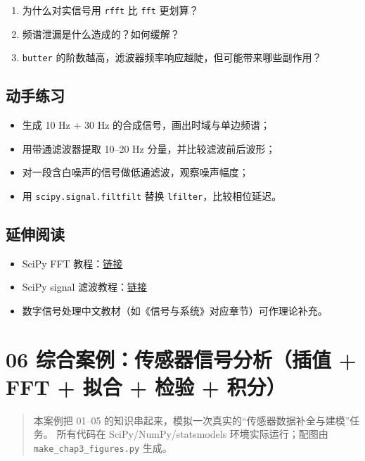 \begin{enumerate}
\def\labelenumi{\arabic{enumi}.}
\tightlist
\item
  为什么对实信号用 \texttt{rfft} 比 \texttt{fft} 更划算？
\item
  频谱泄漏是什么造成的？如何缓解？
\item
  \texttt{butter} 的阶数越高，滤波器频率响应越陡，但可能带来哪些副作用？
\end{enumerate}

\subsection{动手练习}\label{ux52a8ux624bux7ec3ux4e60-4}

\begin{itemize}
\tightlist
\item
  生成 10 Hz + 30 Hz 的合成信号，画出时域与单边频谱；
\item
  用带通滤波器提取 10--20 Hz 分量，并比较滤波前后波形；
\item
  对一段含白噪声的信号做低通滤波，观察噪声幅度；
\item
  用 \texttt{scipy.signal.filtfilt} 替换
  \texttt{lfilter}，比较相位延迟。
\end{itemize}

\subsection{延伸阅读}\label{ux5ef6ux4f38ux9605ux8bfb-14}

\begin{itemize}
\tightlist
\item
  SciPy FFT
  教程：\href{https://docs.scipy.org/doc/scipy/tutorial/fft.html}{链接}
\item
  SciPy signal
  滤波教程：\href{https://docs.scipy.org/doc/scipy/reference/signal.html}{链接}
\item
  数字信号处理中文教材（如《信号与系统》对应章节）可作理论补充。
\end{itemize}

\section{06 综合案例：传感器信号分析（插值 + FFT + 拟合 + 检验 +
积分）}\label{ux7efcux5408ux6848ux4f8bux4f20ux611fux5668ux4fe1ux53f7ux5206ux6790ux63d2ux503c-fft-ux62dfux5408-ux68c0ux9a8c-ux79efux5206}

\begin{quote}
本案例把 01--05
的知识串起来，模拟一次真实的``传感器数据补全与建模''任务。 所有代码在
SciPy/NumPy/statsmodels 环境实际运行；配图由
\texttt{make\_chap3\_figures.py} 生成。
\end{quote}

